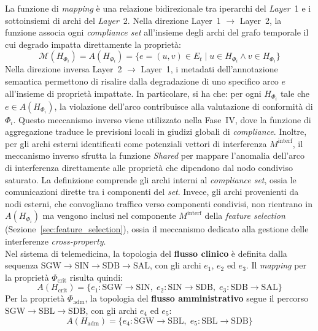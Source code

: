 La funzione di \textit{mapping} è una relazione bidirezionale tra iperarchi del \textit{Layer}~1
e i sottoinsiemi di archi del \textit{Layer}~2. Nella direzione Layer~1 $\to$ Layer~2, la funzione
associa ogni \textit{compliance set} all'insieme degli archi del grafo temporale il cui degrado
impatta direttamente la proprietà:
\begin{equation}
\label{eq:mapping_def}
\mathcal{M}(H_{\Phi_i}) = A(H_{\Phi_i}) = \{e = (u,v) \in E_t \mid u \in H_{\Phi_i} \wedge v \in H_{\Phi_i}\}
\end{equation}
Nella direzione inversa Layer~2 $\to$ Layer~1, i metadati dell'annotazione semantica permettono di
risalire dalla degradazione di uno specifico arco $e$ all'insieme di proprietà impattate. In
particolare, si ha che: per ogni $H_{\Phi_i}$ tale che $e \in A(H_{\Phi_i})$, la violazione
dell'arco contribuisce alla valutazione di conformità di $\Phi_i$. Questo meccanismo inverso viene
utilizzato nella Fase~IV, dove la funzione di aggregazione traduce le previsioni locali in giudizi
globali di \textit{compliance}. Inoltre, per gli archi esterni identificati come potenziali vettori
di interferenza $M^{\text{interf}}$, il meccanismo inverso sfrutta la funzione \textit{Shared} per
mappare l'anomalia dell'arco di interferenza direttamente alle proprietà che dipendono dal nodo
condiviso saturato. La definizione comprende gli archi interni al \textit{compliance set}, ossia le comunicazioni
dirette tra i componenti del \textit{set}. Invece, gli archi provenienti da nodi esterni, che
convogliano traffico verso componenti condivisi, non rientrano in $A(H_{\Phi_i})$ ma vengono
inclusi nel componente $M^{\text{interf}}$ della \textit{feature selection}
(Sezione~\ref{sec:feature_selection}), ossia il meccanismo dedicato alla gestione delle interferenze
\textit{cross-property}. \\
Nel sistema di telemedicina, la topologia del \textbf{flusso clinico} è definita dalla sequenza
$\text{SGW} \to \text{SIN} \to \text{SDB} \to \text{SAL}$, con gli archi $e_1$, $e_2$ ed $e_3$.
Il \textit{mapping} per la proprietà $\Phi_{\text{crit}}$ risulta quindi:
\begin{equation}
\label{eq:mapping_crit}
A(H_{\text{crit}}) = \{e_1\!:\text{SGW}\!\to\!\text{SIN},\; e_2\!:\text{SIN}\!\to\!\text{SDB},\; e_3\!:\text{SDB}\!\to\!\text{SAL}\}
\end{equation}
Per la proprietà $\Phi_{\text{adm}}$, la topologia del \textbf{flusso amministrativo} segue il
percorso $\text{SGW} \to \text{SBL} \to \text{SDB}$, con gli archi $e_4$ ed $e_5$:
\begin{equation}
\label{eq:mapping_adm}
A(H_{\text{adm}}) = \{e_4\!:\text{SGW}\!\to\!\text{SBL},\; e_5\!:\text{SBL}\!\to\!\text{SDB}\}
\end{equation}
